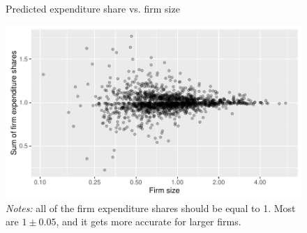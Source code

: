 \documentclass[12pt]{article}
\begin{document}
\begin{figure}
  \caption{Predicted expenditure share vs. firm size}
  \centering
	\includegraphics[width=\textwidth]{../assets/shares-v-size}
	\caption*{\small \emph{Notes:} all of the firm expenditure shares should be equal to 1. Most are $1\pm0.05$, and it gets more accurate for larger firms.}
\end{figure}



\end{document}
